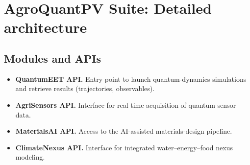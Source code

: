 \documentclass[12pt, a4paper]{article}
\begin{document}
\section{AgroQuantPV Suite: Detailed architecture}

\subsection{Modules and APIs}

\begin{itemize}
    \item \textbf{QuantumEET API.} Entry point to launch quantum-dynamics simulations and retrieve results (trajectories, observables).
    \item \textbf{AgriSensors API.} Interface for real-time acquisition of quantum-sensor data.
    \item \textbf{MaterialsAI API.} Access to the AI-assisted materials-design pipeline.
    \item \textbf{ClimateNexus API.} Interface for integrated water–energy–food nexus modeling.
\end{itemize}

\newpage


\end{document}
